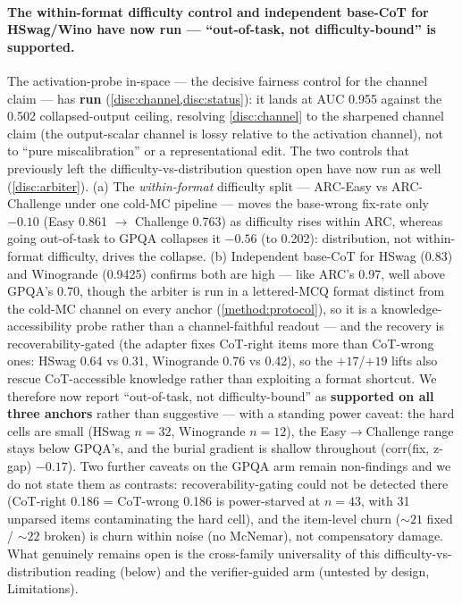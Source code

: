 \paragraph{The within-format difficulty control and independent base-CoT for
HSwag/Wino have now run --- ``out-of-task, not difficulty-bound'' is supported.}
The activation-probe in-space --- the decisive fairness control for the channel
claim --- has \textbf{run} (\cref{disc:channel,disc:status}): it lands at AUC 0.955
against the 0.502 collapsed-output ceiling, resolving \cref{disc:channel} to the
sharpened channel claim (the output-scalar channel is lossy relative to the
activation channel), not to ``pure miscalibration'' or a representational edit. The
two controls that previously left the difficulty-vs-distribution question open have
now run as well (\cref{disc:arbiter}). (a) The \emph{within-format} difficulty
split --- ARC-Easy vs ARC-Challenge under one cold-MC pipeline --- moves the
base-wrong fix-rate only $\mathbf{-0.10}$ (Easy 0.861 $\rightarrow$ Challenge
0.763) as difficulty rises within ARC, whereas going out-of-task to GPQA collapses
it $\mathbf{-0.56}$ (to 0.202): distribution, not within-format difficulty, drives
the collapse. (b) Independent base-CoT for HSwag (0.83) and Winogrande (0.9425)
confirms both are high --- like ARC's 0.97, well above GPQA's 0.70, though the
arbiter is run in a lettered-MCQ format distinct from the cold-MC channel on every
anchor (\cref{method:protocol}), so it is a knowledge-accessibility probe rather than
a channel-faithful readout --- and the
recovery is recoverability-gated (the adapter fixes CoT-right items more than
CoT-wrong ones: HSwag 0.64 vs 0.31, Winogrande 0.76 vs 0.42), so the $+17$/$+19$
lifts also rescue CoT-accessible knowledge rather than exploiting a format
shortcut. We therefore now report ``out-of-task, not difficulty-bound'' as
\textbf{supported on all three anchors} rather than suggestive --- with a standing
power caveat: the hard cells are small (HSwag $n{=}32$, Winogrande $n{=}12$), the
Easy${\rightarrow}$Challenge range stays below GPQA's, and the burial gradient is
shallow throughout (corr(fix, z-gap) $-0.17$). Two further caveats on the GPQA arm
remain non-findings and we do not state them as contrasts: recoverability-gating
could not be detected there (CoT-right 0.186 = CoT-wrong 0.186 is power-starved at
$n{=}43$, with 31 unparsed items contaminating the hard cell), and the item-level
churn (${\sim}21$ fixed / ${\sim}22$ broken) is churn within noise (no McNemar),
not compensatory damage. What genuinely remains open is the cross-family
universality of this difficulty-vs-distribution reading (below) and the
verifier-guided arm (untested by design, Limitations).

